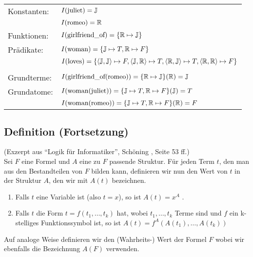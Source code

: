 \documentclass[a4paper]{scrartcl}
\begin{document}
\begin{tabular}{@{}ll}
Konstanten: & $I(\text{juliet}) = \mathbb{J}$                            \\
            & $I(\text{romeo}) = \mathbb{R}$                             \\
Funktionen: & $I(\text{girlfriend\_of}) = \{\mathbb{R} \mapsto \mathbb{J}\}$       \\
Prädikate:  & $I(\text{woman}) = \{ \mathbb{J} \mapsto T, \mathbb{R} \mapsto F\}$ \\
            & $I(\text{loves}) = \{\langle\mathbb{J}, \mathbb{J}\rangle \mapsto F, \langle\mathbb{J},\mathbb{R}\rangle \mapsto T, \langle\mathbb{R},\mathbb{J}\rangle \mapsto T, \langle\mathbb{R},\mathbb{R}\rangle \mapsto F \}$ \\\\
Grundterme:&
$I(\text{girlfriend\_of}(\text{romeo})) = \{\mathbb{R} \mapsto \mathbb{J}\} (\mathbb{R})=\mathbb{J}$
\\
Grundatome:&
$I(\text{woman}(\text{juliet})) = \{\mathbb{J} \mapsto T, \mathbb{R} \mapsto F\} (\mathbb{J}) = T$\\
&$I(\text{woman}(\text{romeo})) = \{\mathbb{J} \mapsto T, \mathbb{R} \mapsto F\} (\mathbb{R}) = F$
\end{tabular}%

\subsection{Definition (Fortsetzung)}
(Exzerpt aus "`Logik für Informatiker"', Schöning , Seite 53 ff.)\\
Sei $F$ eine Formel und $A$ eine zu $F$ passende Struktur. Für jeden Term $t$, den man aus den Bestandteilen von $F$ bilden kann, definieren wir nun den Wert von $t$ in der Struktur $A$, den wir mit $A(t)$ bezeichnen.

\begin{enumerate}
\item Falls $t$ eine Variable ist (also $t=x$), so ist $A(t)=x^A$ .
\item Falls $t$ die Form $t=f(t_1, \ldots, t_k)$ hat, wobei $t_1, \ldots, t_k$ Terme sind und $f$ ein k-stelliges Funktionssymbol ist, so ist $A(t)=f^A(A(t_1), \ldots, A(t_k))$
\end{enumerate}

Auf analoge Weise definieren wir den (Wahrheits-) Wert der Formel $F$ wobei wir ebenfalls die Bezeichnung $A(F)$ verwenden.
\end{document}
